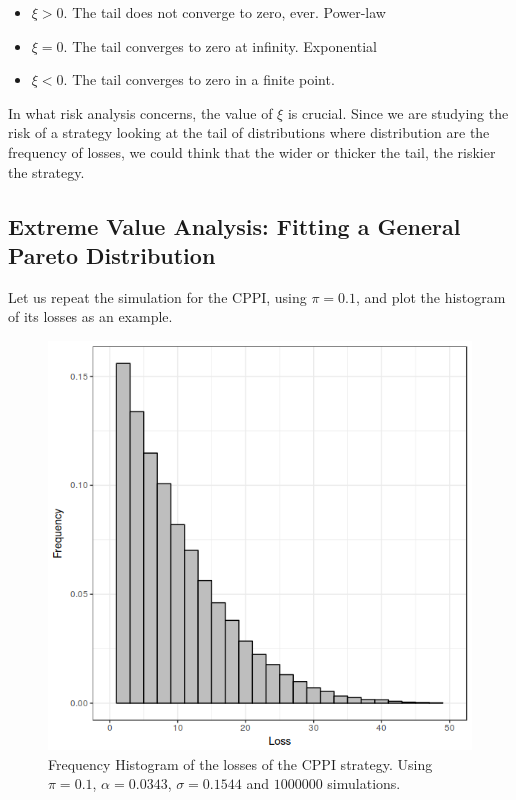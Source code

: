 \begin{itemize}
    \item $\xi > 0$. The tail does not converge to zero, ever. Power-law
    \item $\xi = 0$. The tail converges to zero at infinity. Exponential
    \item $\xi < 0$. The tail converges to zero in a finite point.
\end{itemize}

In what risk analysis concerns, the value of $\xi$ is crucial. Since we are studying the risk of a strategy looking at the tail of distributions where distribution are the frequency of losses, we could think that the wider or thicker the tail, the riskier the strategy.

\subsection{Extreme Value Analysis: Fitting a General Pareto Distribution}

Let us repeat the simulation for the CPPI, using $\pi = 0.1$, and plot the histogram of its losses as an example.

\begin{figure}[h]
    \centering
    \includegraphics[scale=0.75]{images/cppi-losses-hist.png}
    \caption{Frequency Histogram of the losses of the CPPI strategy. Using $\pi = 0.1$, $\alpha = 0.0343$, $\sigma = 0.1544$ and $1000000$ simulations.}
    \label{fig:cppi-losses-histogram}
\end{figure}

